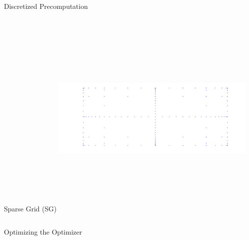 \documentclass[final]{beamer}
\begin{document}
\begin{frame}{}
{\begin{columns}[t]
\begin{column}{.30\linewidth}
\begin{block}{\centering Discretized Precomputation}
\begin{columns}[T]
\begin{column}{12cm}{\centering \scriptsize{Sparse Grid (SG)}}
\centering\includegraphics[height=10cm, width = 10cm]{figures/smolyakpoints}
\end{column}
\end{columns}


\end{block}
                
\begin{block}{\centering Optimizing the Optimizer}

\vspace{1em}


\end{block}
\end{column}
\end{columns}}
\end{frame}
\end{document}
